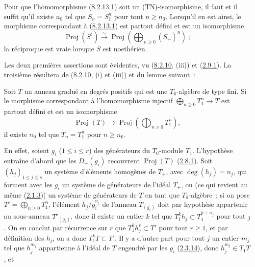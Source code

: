 \begin{proposition}[8.2.14]
\label{II.8.2.14-fr}
Pour que l'homomorphisme (\hyperref[II.8.2.13.1-fr]{8.2.13.1}) soit un
(TN)-isomorphisme, il faut et il suffit qu'il existe $n_0$ tel que
$S_n=S_1^n$ pour tout $n\geq n_0$. Lorsqu'il en est ainsi, le morphisme
correspondant à (\hyperref[II.8.2.13.1-fr]{8.2.13.1}) est partout défini et
est un isomorphisme
\[
  \operatorname{Proj}(S^{\natural})\xrightarrow{\sim}
  \operatorname{Proj}\left(\bigoplus_{n\geq0}(S_+)^n\right)~;
\]
la réciproque est vraie lorsque $S$ est noethérien.
\end{proposition}

Les deux premières assertions sont évidentes, vu
(\hyperref[II.8.2.10-fr]{8.2.10}, (iii)) et
(\hyperref[II.2.9.1-fr]{2.9.1}). La troisième résultera de
(\hyperref[II.8.2.10-fr]{8.2.10}, (i) et (iii)) et du lemme suivant~:

\begin{lemma}[8.2.14.1]
\label{II.8.2.14.1-fr}
Soit $T$ un anneau gradué en degrés positifs qui est une $T_0$-algèbre de type
fini. Si le morphisme correspondant à l'homomorphisme injectif
$\bigoplus_{n\geq0}T_1^n\to T$ est partout défini et est un isomorphisme
\[
  \operatorname{Proj}(T)\to
  \operatorname{Proj}\left(\bigoplus_{n\geq0}T_1^n\right),
\]
il existe $n_0$ tel que $T_n=T_1^n$ pour $n\geq n_0$.
\end{lemma}

En effet, soient $g_i$ ($1\leq i\leq r$) des générateurs du $T_0$-module
$T_1$. L'hypothèse entraîne d'abord que les $D_+(g_i)$ recouvrent
$\operatorname{Proj}(T)$ (\hyperref[II.2.8.1-fr]{2.8.1}). Soit
$(h_j)_{1\leq j\leq s}$ un système d'éléments homogènes de $T_+$, avec
$\deg(h_j)=n_j$, qui forment avec les $g_i$ un système de générateurs de
l'idéal $T_+$, ou (ce qui revient au même
(\hyperref[II.2.1.3-fr]{2.1.3})) un système de générateurs de $T$ en tant que
$T_0$-algèbre~; si on pose $T'=\bigoplus_{n\geq0}T_1^n$, l'élément
$h_j/g_i^{n_j}$ de l'anneau $T_{(g_i)}$ doit par hypothèse appartenir au
sous-anneau $T'_{(g_i)}$, donc il existe un entier $k$ tel que
$T_1^k h_j\subset T_1^{k+n_j}$ pour tout $j$. On en conclut par récurrence
sur $r$ que $T_1^k h_j^r\subset T'$ pour tout $r\geq1$, et par définition des
$h_j$, on a donc $T_1^kT\subset T'$. Il y a d'autre part pour tout $j$ un
entier $m_j$ tel que $h_j^{m_j}$ appartienne à l'idéal de $T$ engendré par
les $g_i$ (\hyperref[II.2.3.14-fr]{2.3.14}), donc $h_j^{m_j}\in T_1T$, et

